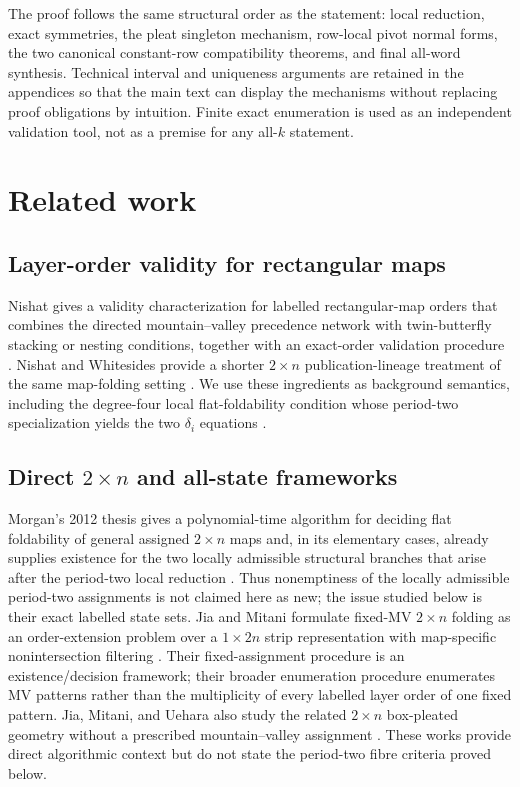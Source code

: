 \documentclass[11pt]{article}
\theoremstyle{definition}
\theoremstyle{remark}
\begin{document}
The proof follows the same structural order as the statement: local reduction, exact symmetries, the pleat singleton mechanism, row-local pivot normal forms, the two canonical constant-row compatibility theorems, and final all-word synthesis. Technical interval and uniqueness arguments are retained in the appendices so that the main text can display the mechanisms without replacing proof obligations by intuition. Finite exact enumeration is used as an independent validation tool, not as a premise for any all-$k$ statement.

\section{Related work}
\subsection{Layer-order validity for rectangular maps}
Nishat gives a validity characterization for labelled rectangular-map orders that combines the directed mountain--valley precedence network with twin-butterfly stacking or nesting conditions, together with an exact-order validation procedure \cite{Nishat2013}. Nishat and Whitesides provide a shorter $2\times n$ publication-lineage treatment of the same map-folding setting \cite{NishatWhitesides2013}. We use these ingredients as background semantics, including the degree-four local flat-foldability condition whose period-two specialization yields the two $\delta_i$ equations \cite{Nishat2013,NishatWhitesides2013}.

\subsection{\texorpdfstring{Direct $2\times n$ and all-state frameworks}{Direct 2 x n and all-state frameworks}}
Morgan's 2012 thesis gives a polynomial-time algorithm for deciding flat foldability of general assigned $2\times n$ maps and, in its elementary cases, already supplies existence for the two locally admissible structural branches that arise after the period-two local reduction \cite[Section~2.2.2]{Morgan2012}. Thus nonemptiness of the locally admissible period-two assignments is not claimed here as new; the issue studied below is their exact labelled state sets. Jia and Mitani formulate fixed-MV $2\times n$ folding as an order-extension problem over a $1\times2n$ strip representation with map-specific nonintersection filtering \cite{JiaMitani2026}. Their fixed-assignment procedure is an existence/decision framework; their broader enumeration procedure enumerates MV patterns rather than the multiplicity of every labelled layer order of one fixed pattern. Jia, Mitani, and Uehara also study the related $2\times n$ box-pleated geometry without a prescribed mountain--valley assignment \cite{JiaMitaniUehara2020}. These works provide direct algorithmic context but do not state the period-two fibre criteria proved below.
\end{document}
